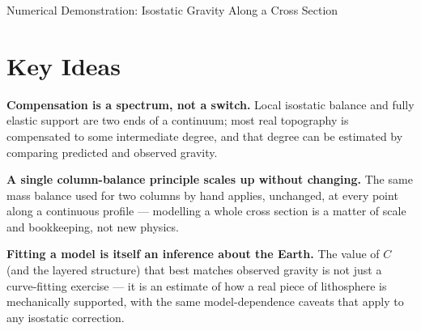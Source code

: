 \begin{activity}{Numerical Demonstration: Isostatic Gravity Along a Cross Section}
\begin{questions}
\end{questions}

\section*{Key Ideas}

\textbf{Compensation is a spectrum, not a switch.} Local isostatic balance and fully elastic support are two ends of a continuum; most real topography is compensated to some intermediate degree, and that degree can be estimated by comparing predicted and observed gravity.

\textbf{A single column-balance principle scales up without changing.} The same mass balance used for two columns by hand applies, unchanged, at every point along a continuous profile --- modelling a whole cross section is a matter of scale and bookkeeping, not new physics.

\textbf{Fitting a model is itself an inference about the Earth.} The value of $C$ (and the layered structure) that best matches observed gravity is not just a curve-fitting exercise --- it is an estimate of how a real piece of lithosphere is mechanically supported, with the same model-dependence caveats that apply to any isostatic correction.

\end{activity}